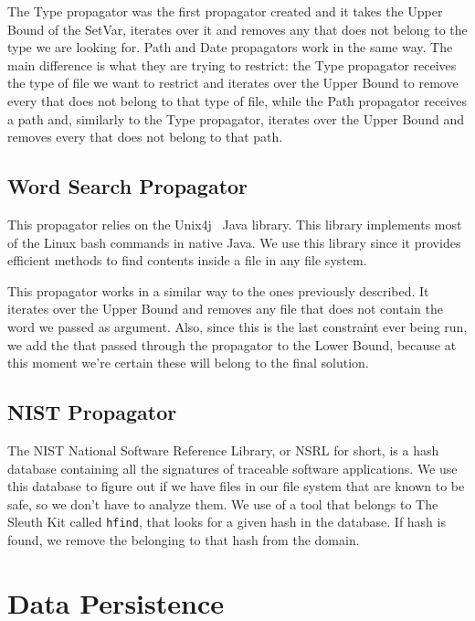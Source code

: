 The Type propagator was the first propagator created and it takes the Upper Bound of the SetVar, iterates over it and removes any \INODE that does not belong to the type we are looking for. Path and Date propagators work in the same way. The main difference is what they are trying to restrict: the Type propagator receives the type of file we want to restrict and iterates over the Upper Bound to remove every \INODE that does not belong to that type of file, while the Path propagator receives a path and, similarly to the Type propagator, iterates over the Upper Bound and removes every \INODE that does not belong to that path.

\subsection{Word Search Propagator}

This propagator relies on the Unix4j~\cite{Unix4j} Java library. This library implements most of the Linux bash commands in native Java. We use this library since it provides efficient methods to find contents inside a file in any file system.

This propagator works in a similar way to the ones previously described. It iterates over the Upper Bound and removes any file that does not contain the word we passed as argument. Also, since this is the last constraint ever being run, we add the \INODES that passed through the propagator to the Lower Bound, because at this moment we're certain these will belong to the final solution.

\subsection{NIST Propagator}

The NIST National Software Reference Library, or NSRL for short, is a hash database containing all the signatures of traceable software applications. We use this database to figure out if we have files in our file system that are known to be safe, so we don't have to analyze them. We use of a tool that belongs to The Sleuth Kit \cite{tsk} called \texttt{hfind}, that looks for a given hash in the database. If hash is found, we remove the \INODE belonging to that hash from the domain.

\section{Data Persistence}
\label{database}

